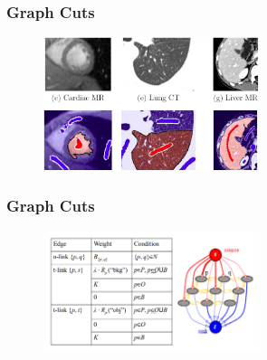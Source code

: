 \documentclass[notheorems,mathserif,table,compress]{beamer}  %
\begin{document}
\begin{frame}
\frametitle{Graph Cuts}
  \begin{figure}[!ht]
  \centering
   \includegraphics[width=2.5in]{graphcut4.png}
   \end{figure}
\end{frame}



\begin{frame}
\frametitle{Graph Cuts}
  \begin{figure}[!ht]
  \centering
   \includegraphics[width=2.5in]{graphcut3.png}
   \end{figure}
\end{frame}

\end{document}

